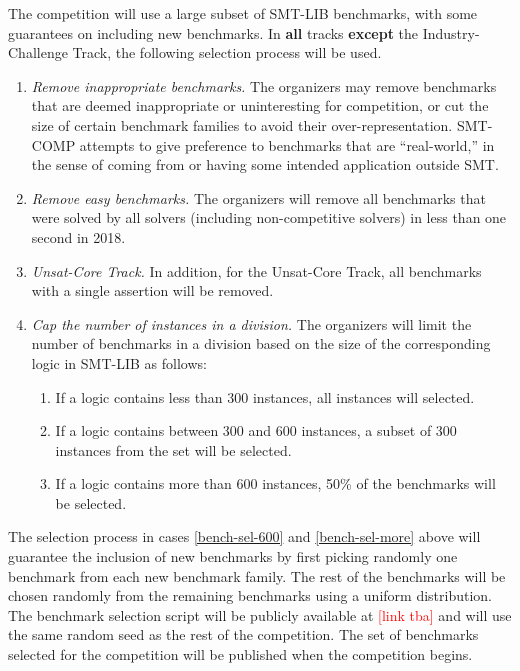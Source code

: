 \documentclass[12pt]{article}
\newcommand{\rem}[1]{\textcolor{red}{[#1]}}
\newcommand{\ucoretrack}{Unsat-Core Track\xspace}
\newcommand{\challtrack}{Industry-Challenge Track\xspace}
\begin{document}
 \label{benchmark-selection}
The competition will use a large subset of SMT-LIB benchmarks, with some
guarantees on including new benchmarks.  In \textbf{all} tracks \textbf{except}
the \challtrack, the following selection process will be used.
\begin{enumerate}
\item \emph{Remove inappropriate benchmarks.} The
  organizers may remove benchmarks that are deemed inappropriate or
  uninteresting for competition, or cut the size of certain benchmark
  families to avoid their over-representation.  SMT-COMP attempts to
  give preference to benchmarks that are ``real-world,'' in the sense
  of coming from or having some intended application outside SMT.
\item \emph{Remove easy benchmarks.} The organizers will remove all
  benchmarks that were solved by all solvers (including non-competitive
  solvers) in less than one second in 2018.
\item \emph{\ucoretrack.} In addition, for the \ucoretrack, all
  benchmarks with a single assertion will be removed.
\item \emph{Cap the number of instances in a division.} The organizers will
  limit the number of benchmarks in a division based on the size of the
  corresponding logic in SMT-LIB as follows:
  \begin{enumerate}
  \vspace{-1ex}
    \item \label{bench-sel-300} If a logic contains less than 300 instances,
      all instances will selected.
  \item \label{bench-sel-600} If a logic contains between 300 and 600
    instances, a subset of 300 instances from the set will be selected.
  \item \label{bench-sel-more} If a logic contains more than 600 instances,
    50\% of the benchmarks will be selected.
  \end{enumerate}
\end{enumerate}
%
The selection process in cases \ref{bench-sel-600} and \ref{bench-sel-more}
above will guarantee the inclusion of new benchmarks by first picking randomly
one benchmark from each new benchmark family.  The rest of the benchmarks will
be chosen randomly from the remaining benchmarks using a uniform distribution.
%
The benchmark selection script will be publicly available at \rem{link tba} and
will use the same random seed as the rest of the competition.  The set of
benchmarks selected for the competition will be published when the competition
begins.
\end{document}
